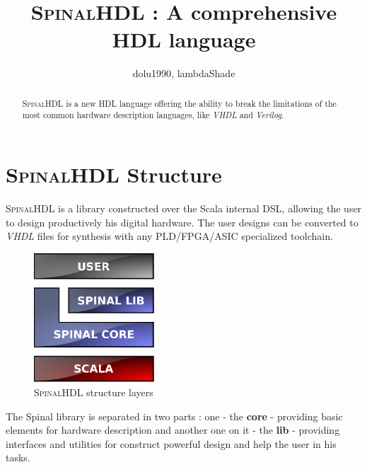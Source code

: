 \documentclass[10pt,twocolumn]{article}
\begin{document}
	
	\title{\textbf{\textsc{SpinalHDL} : A comprehensive HDL language}}
	
	\author{dolu1990, lambdaShade\\}
	
	\maketitle
	\thispagestyle{empty}
	
	\begin{abstract}
		\textsc{SpinalHDL} is a new HDL language offering the ability to break the limitations of the most common hardware description languages, like \textit{VHDL} and \textit{Verilog}.
	\end{abstract}

	\section{\textsc{SpinalHDL} Structure}
		\textsc{SpinalHDL} is a library constructed over the Scala internal DSL, allowing the user to design productively his digital hardware. The user designs can be converted to \textit{VHDL} files for synthesis with any PLD/FPGA/ASIC specialized toolchain. 
		\begin{figure}[!h]
		  \begin{center}
		    \includegraphics[width=4.5cm]{graphics/spinalstructure.eps}
		  \end{center}	
		  \caption{\textsc{SpinalHDL} structure layers}
		  \label{fig:spinalstructure}
		\end{figure}
		\FloatBarrier
		The Spinal library is separated in two parts : one - the \textbf{core} - providing basic elements for hardware description and another one on it - the \textbf{lib} - providing interfaces and utilities for construct powerful design and help the user in his tasks.
		
\end{document}
